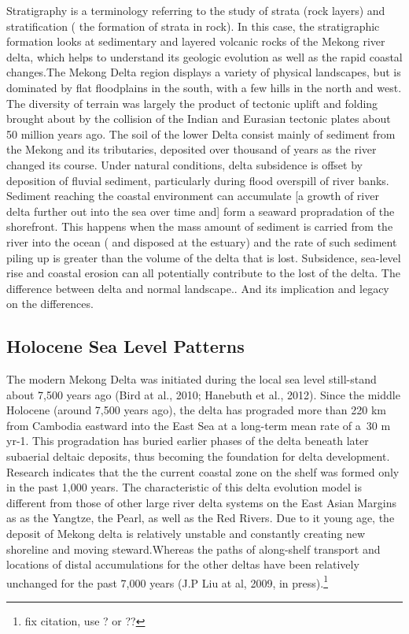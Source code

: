 Stratigraphy is a terminology referring to the study of strata (rock layers) and stratification ( the formation of strata in rock). In this case, the stratigraphic formation looks at sedimentary and layered volcanic rocks of the Mekong river delta, which helps to understand its geologic evolution as well as the rapid coastal changes.The Mekong Delta region displays a variety of physical landscapes, but is dominated by flat floodplains in the south, with a few hills in the north and west. The diversity of terrain was largely the product of tectonic uplift and folding brought about by the collision of the Indian and Eurasian tectonic plates about 50 million years ago. The soil of the lower Delta consist mainly of sediment from the Mekong and its tributaries, deposited over thousand of years as the river changed its course. Under natural conditions, delta subsidence is offset by deposition of fluvial sediment, particularly during flood overspill of river banks. Sediment reaching the coastal environment can accumulate [a growth of river delta further out into the sea over time and] form a seaward propradation of the shorefront. This happens when the mass amount of sediment is carried from the river into the ocean ( and disposed at the estuary) and the rate of such sediment piling up is greater than the volume of the delta that is lost. Subsidence, sea-level rise and coastal erosion can all potentially contribute to the lost of the delta. The difference between delta and normal landscape.. And its implication and legacy on the differences.
 
\subsection{Holocene Sea Level Patterns}

The modern Mekong Delta was initiated during the local sea level still-stand about 7,500 years ago (Bird at al., 2010; Hanebuth et al., 2012). Since the middle Holocene (around 7,500 years ago), the delta has prograded more than 220 km from Cambodia eastward into the East Sea at a long-term mean rate of a~30 m yr-1. This progradation has buried earlier phases of the delta beneath later subaerial deltaic deposits, thus becoming the foundation for delta development. Research indicates that the the current coastal zone on the shelf was formed only in the past 1,000 years. The characteristic of this delta evolution model is different from those of other large river delta systems on the East Asian Margins as as the Yangtze, the Pearl, as well as the Red Rivers. Due to it young age, the deposit of Mekong delta is relatively unstable and constantly creating new shoreline and moving steward.Whereas the paths of along-shelf transport and locations of distal accumulations for the other deltas have been relatively unchanged for the past 7,000 years (J.P Liu at al, 2009, in press).\footnote{fix citation, use \citet{xue2011changes}? or ??}
	
